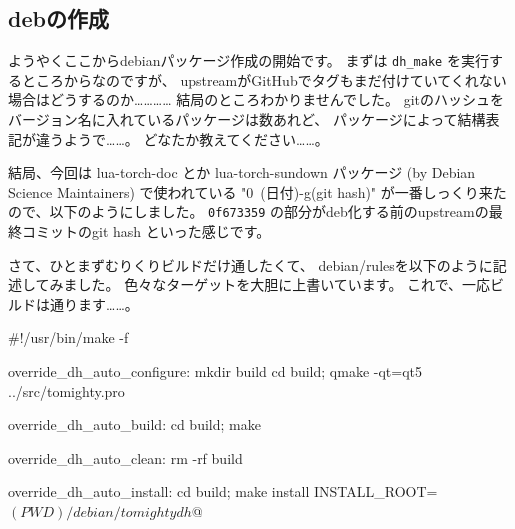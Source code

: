 \documentclass[mingoth,a4paper]{jsarticle}
\begin{document}
\subsection{debの作成}

ようやくここからdebianパッケージ作成の開始です。
まずは \verb|dh_make| を実行するところからなのですが、
upstreamがGitHubでタグもまだ付けていてくれない場合はどうするのか…………
結局のところわかりませんでした。
gitのハッシュをバージョン名に入れているパッケージは数あれど、
パッケージによって結構表記が違うようで……。
どなたか教えてください……。

結局、今回は lua-torch-doc とか lua-torch-sundown パッケージ
(by Debian Science Maintainers) で使われている "0~(日付)-g(git hash)"
が一番しっくり来たので、以下のようにしました。
\texttt{0f673359} の部分がdeb化する前のupstreamの最終コミットのgit hash
といった感じです。
\begin{commandline}
\end{commandline}

さて、ひとまずむりくりビルドだけ通したくて、
debian/rulesを以下のように記述してみました。
色々なターゲットを大胆に上書いています。
これで、一応ビルドは通ります……。
\begin{commandline}
#!/usr/bin/make -f

override_dh_auto_configure:
        mkdir build
        cd build; qmake -qt=qt5 ../src/tomighty.pro

override_dh_auto_build:
        cd build; make

override_dh_auto_clean:
        rm -rf build

override_dh_auto_install:
        cd build; make install INSTALL_ROOT=$(PWD)/debian/tomighty

        dh $@
\end{commandline}
\end{document}
